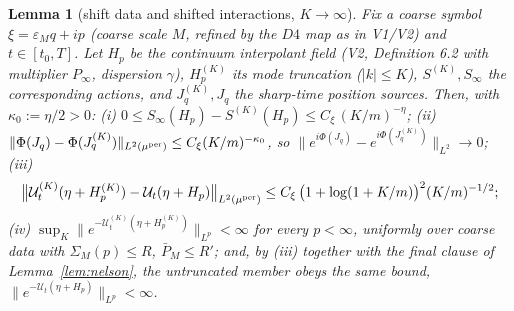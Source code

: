\documentclass[11pt,a4paper]{article}
\theoremstyle{plain}
\newtheorem{lemma}[theorem]{Lemma}
\theoremstyle{definition}
\newcommand{\eps}{\varepsilon}
\newcommand{\U}{\mathcal U}
\begin{document}
\begin{lemma}[shift data and shifted interactions, $K\to\infty$]
\label{lem:shiftlimits}
Fix a coarse symbol $\xi=\eps_Mq+ip$ (coarse scale $M$, refined by the
$D4$ map as in V1/V2) and $t\in[t_0,T]$. Let $H_p$ be the continuum
interpolant field (V2, Definition 6.2 with multiplier $P_\infty$,
dispersion $\gamma$), $H^{(K)}_p$ its mode truncation ($|k|\le K$),
$S^{(K)},S_\infty$ the corresponding actions, and $J^{(K)}_q,J_q$ the
sharp-time position sources. Then, with $\kappa_0:=\eta/2>0$:
\emph{(i)} $0\le S_\infty(H_p)-S^{(K)}(H_p)\le C_\xi\,(K/m)^{-\eta}$;
\emph{(ii)} $\|\Phi(J_q)-\Phi(J^{(K)}_q)\|_{L^2(\mu^{\rm per})}\le
C_\xi(K/m)^{-\kappa_0}$, so
$\|e^{i\Phi(J_q)}-e^{i\Phi(J^{(K)}_q)}\|_{L^2}\to0$;
\emph{(iii)}
\[
 \bigl\|\U^{(K)}_t(\eta+H^{(K)}_p)-\U_t(\eta+H_p)\bigr\|
 _{L^2(\mu^{\rm per})}\le C_\xi\,\bigl(1+\log(1+K/m)\bigr)^2(K/m)^{-1/2};
\]
\emph{(iv)} $\sup_K\|e^{-\U^{(K)}_t(\eta+H^{(K)}_p)}\|_{L^p}<\infty$ for
every $p<\infty$, uniformly over coarse data with $\Sigma_M(p)\le R$,
$\bar P_M\le R'$; and, by (iii) together with the final clause of
Lemma~\ref{lem:nelson}, the untruncated member obeys the same bound,
$\|e^{-\U_t(\eta+H_p)}\|_{L^p}<\infty$.
\end{lemma}
\end{document}
